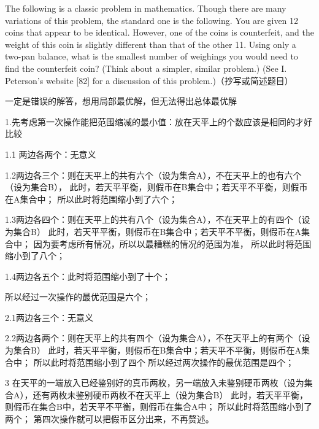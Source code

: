 \documentclass[11pt, a4paper, UTF8]{ctexart}
\begin{document}
\begin{problem}[UD: 1.8]	%
  The following is a classic problem in mathematics. Though there are many variations of this problem, the standard one is the following.
You are given 12 coins that appear to be identical. However, one of the coins is counterfeit, and the weight of this coin is slightly different than that of the other 11. Using only a two-pan balance, what is the smallest number of weighings you would need to find the counterfeit coin? (Think about a simpler, similar problem.)
(See I. Peterson’s website [82] for a discussion of this problem.)（抄写或简述题目）
\end{problem}

\begin{remark}	%
  一定是错误的解答，想用局部最优解，但无法得出总体最优解
\end{remark}

\begin{solution}
   1.先考虑第一次操作能把范围缩减的最小值：放在天平上的个数应该是相同的才好比较
 
 
  1.1 两边各两个：无意义
 
 
  1.2两边各三个：则在天平上的共有六个（设为集合A），不在天平上的也有六个（设为集合B），
  		此时，若天平平衡，则假币在B集合中；若天平不平衡，则假币在A集合中；
		所以此时将范围缩小到了六个；
  
  
  1.3两边各四个：则在天平上的共有八个（设为集合A），不在天平上的有四个（设为集合B）
  		此时，若天平平衡，则假币在B集合中；若天平不平衡，则假币在A集合中；
		因为要考虑所有情况，所以以最糟糕的情况的范围为准，
		所以此时将范围缩小到了八个；
  
  
  1.4两边各五个：此时将范围缩小到了十个；
  
  
  所以经过一次操作的最优范围是六个；
 
 
 
  2.1两边各三个：无意义
  
  2.2两边各两个：则在天平上的共有四个（设为集合A），不在天平上的有两个（设为集合B）
  			此时，若天平平衡，则假币在B集合中；若天平不平衡，则假币在A集合中；
			所以此时将范围缩小到了四个
所以经过两次操作的最优范围是四个；



3 在天平的一端放入已经鉴别好的真币两枚，另一端放入未鉴别硬币两枚（设为集合A），还有两枚未鉴别硬币两枚不在天平上（设为集合B）
			此时，若天平平衡，则假币在集合B中，若天平不平衡，则假币在集合A中；
			所以此时将范围缩小到了两个；
第四次操作就可以把假币区分出来，不再赘述。
  			
 \end{solution}
\end{document}
